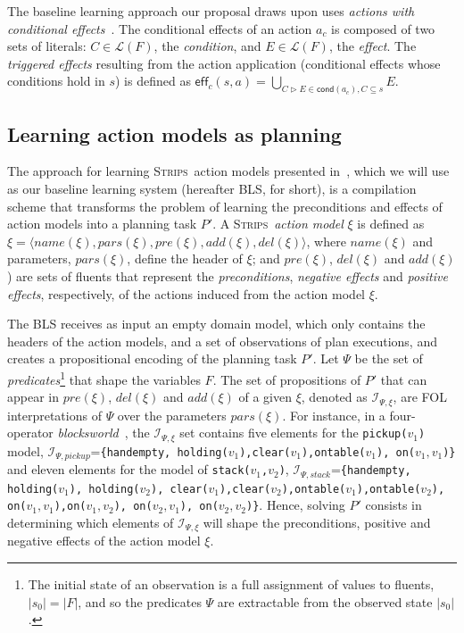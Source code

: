 \documentclass{article}
\newcommand{\tup}[1]{{\langle #1 \rangle}}
\newcommand{\eff}{\mathsf{eff}}     %
\newcommand{\cond}{\mathsf{cond}}   %
\newcommand{\strips}{\textsc{Strips}}
\begin{document}
The baseline learning approach our proposal draws upon uses {\em actions with conditional effects}~\cite{aineto2018learning}. The conditional effects of an action $a_c$ is composed of two sets of literals: $C\in\mathcal{L}(F)$, the {\em condition}, and $E\in\mathcal{L}(F)$, the {\em effect}. The {\em triggered effects} resulting from the action application (conditional effects whose conditions hold in $s$) is defined as $\eff_c(s,a)=\bigcup_{C\rhd E\in\cond(a_c),C\subseteq s} E$.


\subsection{Learning action models as planning}
\label{FAMA}

The approach for learning \strips\ action models presented in~\cite{aineto2018learning}, which we will use as our baseline learning system (hereafter BLS, for short), is a compilation scheme that transforms the problem of learning the preconditions and effects of action models into a planning task $P'$. A \strips\ \emph{action model} $\xi$ is defined as $\xi=\tup{name(\xi),pars(\xi),pre(\xi),add(\xi),del(\xi)}$, where $name(\xi)$ and parameters, $pars(\xi)$, define the header of $\xi$; and $pre(\xi)$, $del(\xi)$ and $add(\xi)$) are sets of fluents that represent the {\em preconditions}, {\em negative effects} and {\em positive effects}, respectively, of the actions induced from the action model $\xi$.

The BLS receives as input an empty domain model, which only contains the headers of the action models, and a set of observations of plan executions, and creates a propositional encoding of the planning task $P'$. Let $\Psi$ be the set of {\em predicates}\footnote{The initial state of an observation is a full assignment of values to fluents, $|s_0|=|F|$, and so the predicates $\Psi$ are extractable from the observed state $|s_0|$.} that shape the variables $F$. The set of propositions of $P'$ that can appear in $pre(\xi)$, $del(\xi)$ and $add(\xi)$ of a given $\xi$, denoted as ${\mathcal I}_{\Psi,\xi}$, are FOL interpretations of $\Psi$ over the parameters $pars(\xi)$. For instance, in a four-operator {\em blocksworld}~\cite{slaney2001blocks}, the ${\mathcal I}_{\Psi,\xi}$ set contains five elements for the {\small \tt pickup($v_1$)} model, ${\mathcal I}_{\Psi,pickup}$={\small\tt\{handempty, holding($v_1$),clear($v_1$),ontable($v_1$), on($v_1,v_1$)\}} and eleven elements for the model of {\small \tt stack($v_1$,$v_2$)}, ${\mathcal I}_{\Psi,stack}$={\small\tt\{handempty, holding($v_1$), holding($v_2$), clear($v_1$),clear($v_2$),ontable($v_1$),ontable($v_2$), \\
on($v_1,v_1$),on($v_1,v_2$), on($v_2,v_1$), on($v_2,v_2$)\}}. Hence, solving $P'$ consists in determining which elements of ${\mathcal I}_{\Psi,\xi}$ will shape the preconditions, positive and negative effects of the action model $\xi$.
\end{document}
